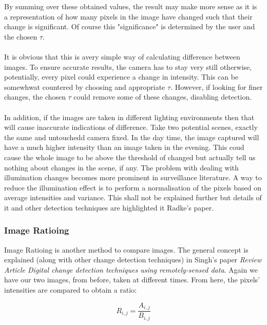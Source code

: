 \documentclass[11pt]{article}
\begin{document}
By summing over these obtained values, the result may make more
sense as it is a representation of how many pixels in the image have
changed such that their change is significant. Of course this
"significance" is determined by the user and the chosen $\tau$.\\
\\
It is obvious that this is avery simple way of calculating difference
between images. To ensure accurate results, the camera has to stay
very still otherwise, potentially, every pixel could experience a 
change in intensity. This can be somewhwat countered by choosing
and appropriate $\tau$. However, if looking for finer changes, the
chosen $\tau$ could remove some of these changes, disabling detection.\\
\\
In addition, if the images are taken in different lighting environments
then that will cause inaccurate indications of difference. Take two
potential scenes, exactly the same and untouchedd camera fixed. In
the day time, the image captured will have a much higher intensity
than an image taken in the evening. This coud cause the whole image
to be above the threshold of changed but actually tell us nothing 
about changes in the scene, if any. The problem with dealing with
illumination changes becomes more prominent in surveillance literature.
A way to reduce the illumination effect is to perform a normalisation
of the pixels based on average intensities and variance. This shall
not be explained further but details of it and other detection 
techniques are highlighted it Radke's paper\cite{Radke04}.

\subsubsection{Image Ratioing}
Image Ratioing is another method to compare images. The general concept
is explained (along with other change detection techniques) in Singh's
paper \textit{Review Article Digital change detection techniques 
using remotely-sensed data}\cite{Singh88}. Again we have our two images,
from before, taken at different times. From here, the pixels' intensities
are compared to obtain a ratio:

\begin{equation}
	R_{i,j} = \frac{A_{i,j}}{B_{i,j}}
\end{equation}
\end{document}
